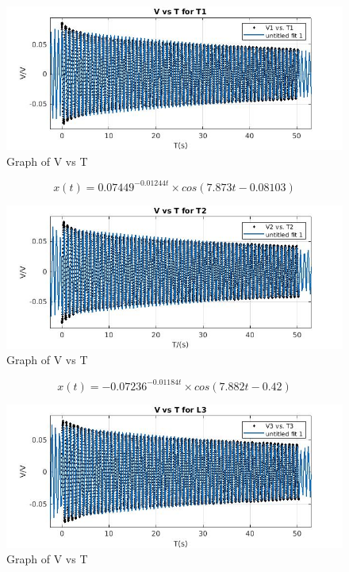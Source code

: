 \begin{figure}[h!]
    \centering
    \includegraphics[width=\textwidth]{figures/L1.jpg}
    \caption{Graph of V vs T}
    \label{fig:yx}
\end{figure}
$$ x(t) = 0.07449^{-0.01244t} \times cos(7.873t -0.08103) $$
\newpage
\begin{figure}[h!]
    \centering
    \includegraphics[width=\textwidth]{figures/L2.jpg}
    \caption{Graph of V vs T}
    \label{fig:yx}
\end{figure}
$$ x(t) = -0.07236^{-0.01184t} \times cos(7.882t -0.42) $$
\newpage
\begin{figure}[h!]
    \centering
    \includegraphics[width=\textwidth]{figures/L3.jpg}
    \caption{Graph of V vs T}
    \label{fig:yx}
\end{figure}
